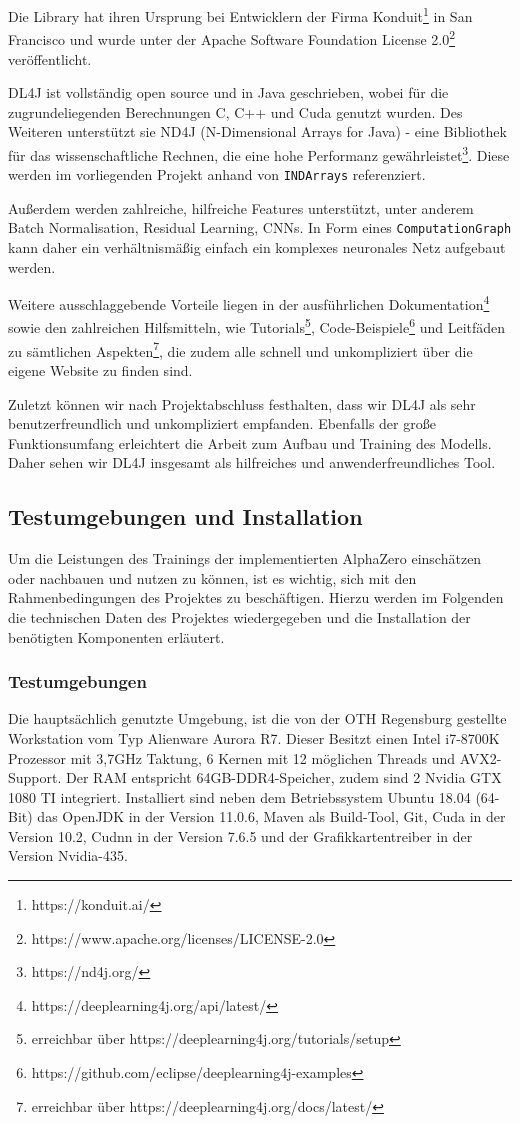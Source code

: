 \documentclass[12pt,a4paper]{article}
\begin{document}
Die Library hat ihren Ursprung bei Entwicklern der Firma Konduit\footnote{https://konduit.ai/} in San Francisco und wurde unter der Apache Software Foundation License 2.0\footnote{https://www.apache.org/licenses/LICENSE-2.0} veröffentlicht.

DL4J ist vollständig open source und in Java geschrieben, wobei für die zugrundeliegenden Berechnungen C, C++ und Cuda genutzt wurden. Des Weiteren unterstützt sie ND4J (N-Dimensional Arrays for Java) - eine Bibliothek für das wissenschaftliche Rechnen, die eine hohe Performanz gewährleistet\footnote{https://nd4j.org/}. Diese werden im vorliegenden Projekt anhand von \texttt{INDArrays} referenziert.

Außerdem werden zahlreiche, hilfreiche Features unterstützt, unter anderem Batch Normalisation, Residual Learning, CNNs. In Form eines \texttt{ComputationGraph} kann daher ein verhältnismäßig einfach ein komplexes neuronales Netz aufgebaut werden.

Weitere ausschlaggebende Vorteile liegen in der ausführlichen Dokumentation\footnote{https://deeplearning4j.org/api/latest/} sowie den zahlreichen Hilfsmitteln, wie Tutorials\footnote{erreichbar über https://deeplearning4j.org/tutorials/setup}, Code-Beispiele\footnote{https://github.com/eclipse/deeplearning4j-examples} und Leitfäden zu sämtlichen Aspekten\footnote{erreichbar über https://deeplearning4j.org/docs/latest/}, die zudem alle schnell und unkompliziert über die eigene Website zu finden sind.

Zuletzt können wir nach Projektabschluss festhalten, dass wir DL4J als sehr benutzerfreundlich und unkompliziert empfanden. Ebenfalls der große Funktionsumfang erleichtert die Arbeit zum Aufbau und Training des Modells. Daher sehen wir DL4J insgesamt als hilfreiches und anwenderfreundliches Tool.


\subsection{Testumgebungen und Installation}
Um die Leistungen des Trainings der implementierten AlphaZero einschätzen oder nachbauen und nutzen zu können, ist es wichtig, sich mit den Rahmenbedingungen des Projektes zu beschäftigen. Hierzu werden im Folgenden die technischen Daten des Projektes wiedergegeben und die Installation der benötigten Komponenten erläutert.

\subsubsection{Testumgebungen}
Die hauptsächlich genutzte Umgebung, ist die von der OTH Regensburg gestellte Workstation vom Typ Alienware Aurora R7. Dieser Besitzt einen Intel i7-8700K Prozessor mit 3,7GHz Taktung, 6 Kernen mit 12 möglichen Threads und AVX2-Support. Der RAM entspricht 64GB-DDR4-Speicher, zudem sind 2 Nvidia GTX 1080 TI integriert. Installiert sind neben dem Betriebssystem Ubuntu 18.04 (64-Bit) das OpenJDK in der Version 11.0.6, Maven als Build-Tool, Git, Cuda in der Version 10.2, Cudnn in der Version 7.6.5 und der Grafikkartentreiber in der Version Nvidia-435.
\end{document}
